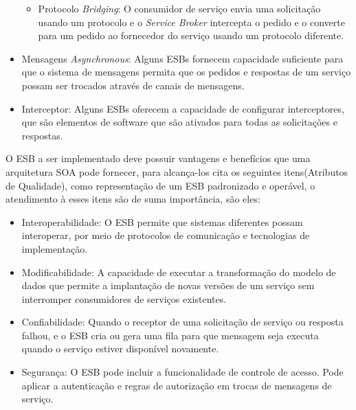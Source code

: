 \begin{itemize}
\begin{itemize}
\item Protocolo \textit{Bridging}: O consumidor de serviço envia uma solicitação usando um protocolo e o \textit{Service Broker} intercepta o pedido e o converte para um pedido ao fornecedor do serviço usando um protocolo diferente.

\end{itemize}

\item Mensagens \textit{Asynchronous}: Alguns \acrshort{ESB}s fornecem capacidade suficiente para que o sistema de mensagens permita que os pedidos e respostas de um serviço possam ser trocados através de canais de mensagens.

\item Interceptor: Alguns \acrshort{ESB}s oferecem a capacidade de configurar interceptores, que são elementos de software que são ativados para todas as solicitações e respostas.

\end{itemize}

O \acrshort{ESB} a ser implementado deve possuir vantagens e benefícios que uma arquitetura \acrshort{SOA} pode fornecer, para alcança-los \cite{bianco2011architecting} cita os seguintes itens(Atributos de Qualidade), como representação de um \acrshort{ESB} padronizado e operável, o atendimento à esses itens são de suma importância, são eles:

\begin{itemize}

\item Interoperabilidade: O \acrshort{ESB} permite que sistemas diferentes possam interoperar, por meio de protocolos de comunicação e tecnologias de implementação. 

\item Modificabilidade: A capacidade de executar a transformação do modelo de dados que permite a implantação de novas versões de um serviço sem interromper consumidores de serviços existentes. 

\item Confiabilidade: Quando o receptor de uma solicitação de serviço ou resposta falhou, e o ESB cria ou gera uma fila para que mensagem seja executa quando o serviço estiver disponível novamente. 

\item Segurança: O \acrshort{ESB} pode incluir a funcionalidade de controle de acesso. Pode aplicar a autenticação e regras de autorização em trocas de mensagens de serviço.

\end{itemize}


